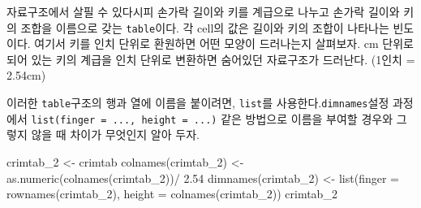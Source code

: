 \documentclass[
]{article}
\newenvironment{Shaded}{\begin{snugshade}}{\end{snugshade}}
\newcommand{\AttributeTok}[1]{\textcolor[rgb]{0.77,0.63,0.00}{#1}}
\newcommand{\FloatTok}[1]{\textcolor[rgb]{0.00,0.00,0.81}{#1}}
\newcommand{\FunctionTok}[1]{\textcolor[rgb]{0.00,0.00,0.00}{#1}}
\newcommand{\NormalTok}[1]{#1}
\newcommand{\OtherTok}[1]{\textcolor[rgb]{0.56,0.35,0.01}{#1}}
\newcommand{\SpecialCharTok}[1]{\textcolor[rgb]{0.00,0.00,0.00}{#1}}
\begin{document}
자료구조에서 살필 수 있다시피 손가락 길이와 키를 계급으로 나누고 손가락
길이와 키의 조합을 이름으로 갖는 \texttt{table}이다. 각 cell의 값은
길이와 키의 조합이 나타나는 빈도이다. 여기서 키를 인치 단위로 환원하면
어떤 모양이 드러나는지 살펴보자. cm 단위로 되어 있는 키의 계급을 인치
단위로 변환하면 숨어있던 자료구조가 드러난다. (1인치 = 2.54cm)

이러한 \texttt{table}구조의 행과 열에 이름을 붙이려면, \texttt{list}를
사용한다.\texttt{dimnames}설정 과정에서
\texttt{list(finger\ =\ ...,\ height\ =\ ...)} 같은 방법으로 이름을
부여할 경우와 그렇지 않을 때 차이가 무엇인지 알아 두자.

\begin{Shaded}
\begin{Highlighting}[]
\NormalTok{crimtab\_2 }\OtherTok{\textless{}{-}}\NormalTok{ crimtab}
\FunctionTok{colnames}\NormalTok{(crimtab\_2) }\OtherTok{\textless{}{-}} \FunctionTok{as.numeric}\NormalTok{(}\FunctionTok{colnames}\NormalTok{(crimtab\_2))}\SpecialCharTok{/} \FloatTok{2.54}
\FunctionTok{dimnames}\NormalTok{(crimtab\_2) }\OtherTok{\textless{}{-}} \FunctionTok{list}\NormalTok{(}\AttributeTok{finger =} \FunctionTok{rownames}\NormalTok{(crimtab\_2), }
                            \AttributeTok{height =} \FunctionTok{colnames}\NormalTok{(crimtab\_2))}
\NormalTok{crimtab\_2}
\end{Highlighting}
\end{Shaded}
\end{document}
